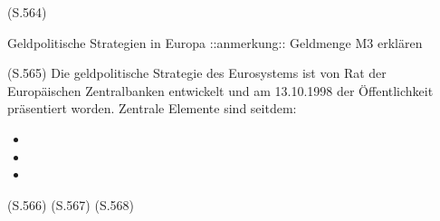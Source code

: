 \documentclass[
      onecolumn,
      a4paper,
      abstracton,
      parskip=half
      ,final
      ]{scrartcl}
\begin{document}
(S.564)

Geldpolitische Strategien in Europa
::anmerkung:: Geldmenge M3 erkl{\"a}ren

(S.565)
Die geldpolitische Strategie des Eurosystems ist von Rat der Europäischen Zentralbanken entwickelt und am 13.10.1998 der Öffentlichkeit präsentiert worden.
Zentrale Elemente sind seitdem:
\begin{itemize}
    \item{}
    \item{}
    \item{}
\end{itemize}


(S.566)
(S.567)
(S.568)
\end{document}
